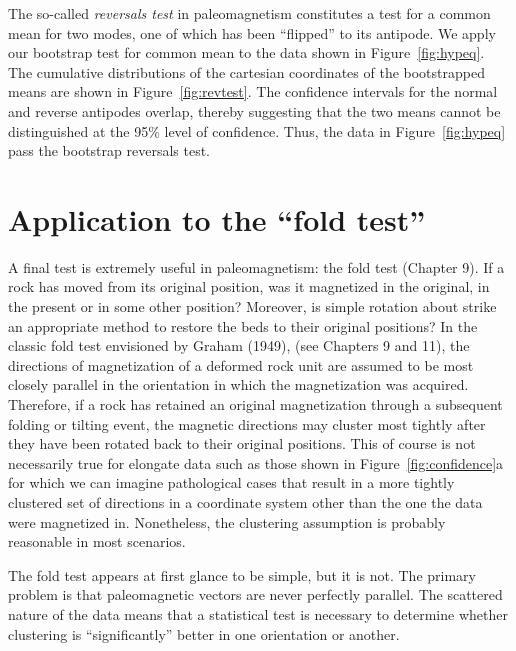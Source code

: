 The so-called 
{\it reversals test} in paleomagnetism constitutes a test
for a common mean for two modes, one of which has been ``flipped'' to
its antipode.  We apply our bootstrap test for common mean to the data shown
in Figure~\ref{fig:hypeq}.  The cumulative distributions of the cartesian coordinates
of the bootstrapped means are shown in Figure~\ref{fig:revtest}.  The confidence intervals
for the normal and reverse antipodes overlap, thereby  suggesting  that the two
means cannot be distinguished at the 95\% level of confidence.  
 Thus,  the data in Figure~\ref{fig:hypeq} pass the bootstrap reversals test.  



\section {Application to the ``fold test''}

A final test is extremely useful in paleomagnetism: the 
 fold
test (Chapter 9).  
 If a rock has moved from its original
position, was  it magnetized in the original,  in the present  or in
some other position?  Moreover, is simple rotation about strike an
appropriate method to restore the beds to their original positions?
In the classic fold test envisioned  by 
Graham (1949),   \nocite{graham49}  (see Chapters 9 and  11),
the
directions of magnetization of a deformed rock unit are assumed to be
most closely
parallel in the orientation in which the magnetization was acquired.
Therefore, if
a rock has retained an original magnetization through a subsequent
folding or
tilting event, the magnetic directions may cluster most tightly after
they have been rotated back to their original positions.  This of course is not necessarily true for elongate data such as those shown in Figure~\ref{fig:confidence}a for which we can imagine pathological cases that result in a more tightly clustered set of directions in a coordinate system other than the one the data were magnetized in.  Nonetheless, the clustering assumption is probably reasonable in most scenarios.  



The fold test appears at first glance
 to be simple, but it is not.
The primary problem is that paleomagnetic
vectors are never perfectly parallel.  The
scattered nature of the data means that a statistical test is
necessary to determine whether clustering is ``significantly'' better
in one orientation or another.


